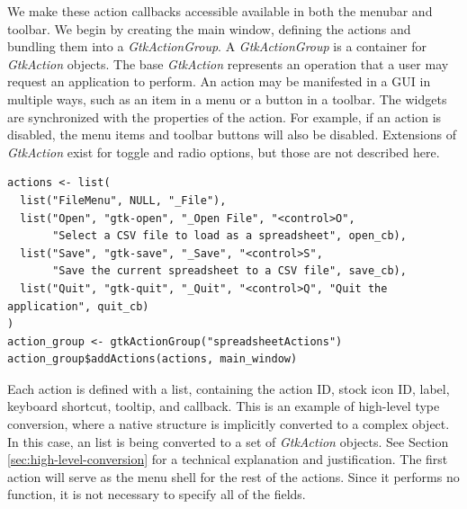\documentclass[article]{jss}
\begin{document}
We make these action callbacks accessible available in both the
menubar and toolbar. We begin by creating the main window, defining
the actions and bundling them into a \emph{GtkActionGroup}.  A
\emph{GtkActionGroup} is a container for \emph{GtkAction} objects. 
The base \emph{GtkAction} represents an operation that a user may
request an application to perform. An action may be manifested in a
GUI in multiple ways, such as an item in a menu or a button in a
toolbar. The widgets are synchronized with the properties of the
action. For example, if an action is disabled, the menu items and
toolbar buttons will also be disabled. Extensions of \emph{GtkAction}
exist for toggle and radio options, but those are not described here.
\begin{verbatim}
actions <- list(
  list("FileMenu", NULL, "_File"), 
  list("Open", "gtk-open", "_Open File", "<control>O", 
       "Select a CSV file to load as a spreadsheet", open_cb),
  list("Save", "gtk-save", "_Save", "<control>S", 
       "Save the current spreadsheet to a CSV file", save_cb),
  list("Quit", "gtk-quit", "_Quit", "<control>Q", "Quit the
application", quit_cb)
)
action_group <- gtkActionGroup("spreadsheetActions")
action_group$addActions(actions, main_window)
\end{verbatim}
Each action is defined with a list, containing the action ID,
stock icon ID,
label, keyboard shortcut, tooltip, and callback.
This is an example of 
high-level type conversion, where a native  structure is
implicitly converted to a complex  object. In this case, an
 list is being converted to a set of \emph{GtkAction}
objects. See Section \ref{sec:high-level-conversion} for
a technical explanation and justification. The first action will serve
as the menu shell
for the rest of the actions. Since it performs no
function, it is not necessary to specify all of the fields. 
\end{document}
